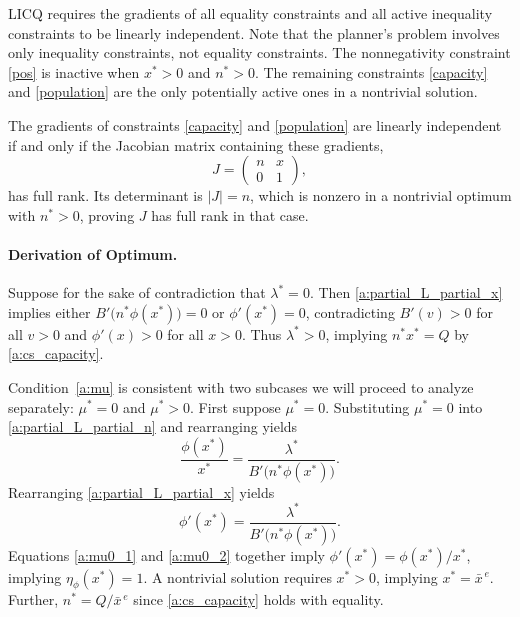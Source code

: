 \documentclass[12pt]{article}
\newcommand{\efficacy}{\phi}
\newcommand{\benefit}{B}
\newcommand{\xunitbar}{\bar{x}^{\,e}}
\newcommand{\elasticity}[1]{\eta_{#1}}
\begin{document}
LICQ requires the gradients of all equality constraints and all active
inequality constraints to be linearly independent. Note that the
planner's problem involves only inequality constraints, not equality
constraints. The nonnegativity constraint \eqref{pos} is inactive when
$x^* > 0$ and $n^* > 0$. The remaining constraints \eqref{capacity}
and \eqref{population} are the only potentially active ones in a
nontrivial solution.

The gradients of constraints \eqref{capacity} and \eqref{population}
are linearly independent if and only if the Jacobian matrix containing
these gradients,
\begin{equation}
\label{a:Jacobian}
J = \begin{pmatrix}
n & x \\
0 & 1
\end{pmatrix},
\end{equation}
has full rank. Its determinant is $|J| = n$, which is nonzero in a
nontrivial optimum with $n^* > 0$, proving $J$ has full rank in that
case.

\paragraph{Derivation of Optimum.}

Suppose for the sake of contradiction that $\lambda^* = 0$. Then
\eqref{a:partial_L_partial_x} implies either $\benefit' \! \bigl( n^*
\efficacy(x^*) \bigr) = 0$ or $\efficacy'(x^*) = 0$, contradicting
$\benefit'(v) > 0$ for all $v > 0$ and $\efficacy'(x) > 0$ for all $x
> 0$. Thus $\lambda^* > 0$, implying $n^* x^* = Q$ by
\eqref{a:cs_capacity}.

Condition~\ref{a:mu} is consistent with two subcases we will proceed
to analyze separately: $\mu^* = 0$ and $\mu^* > 0$. First suppose
$\mu^* = 0$. Substituting $\mu^* = 0$ into
\eqref{a:partial_L_partial_n} and rearranging yields
\begin{equation}
\label{a:mu0_1}
\frac{\efficacy(x^*)}{x^*} =
\frac{\lambda^*}{\benefit'\!\bigl( n^*\efficacy(x^*) \bigr)}.
\end{equation}
Rearranging \eqref{a:partial_L_partial_x} yields 
\begin{equation}
\label{a:mu0_2}
\efficacy'(x^*) = \frac{\lambda^*}{\benefit'\!\bigl( n^*\efficacy(x^*)
  \bigr)}.
\end{equation}
Equations \eqref{a:mu0_1} and \eqref{a:mu0_2} together imply
$\efficacy'(x^*) = \efficacy(x^*) / x^*$, implying
$\elasticity{\efficacy}(x^*) = 1$. A nontrivial solution requires $x^*
> 0$, implying $x^* = \xunitbar$. Further, $n^* = Q/\xunitbar$ since
\eqref{a:cs_capacity} holds with equality.
\end{document}
